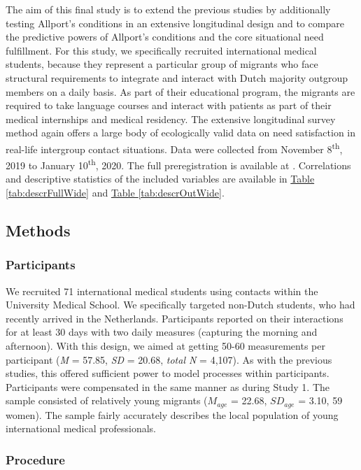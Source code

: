 \documentclass[man, 12pt, a4paper, mask]{apa7}
\theoremstyle{break}
\theoremstyle{plain}
\newcommand{\tblref}[2][]{\hyperref[#2]{Table \ref*{#2}#1}}
\begin{document}
The aim of this final study is to extend the previous studies by
additionally testing Allport's conditions in an extensive longitudinal
design and to compare the predictive powers of Allport's conditions and
the core situational need fulfillment. For this study, we specifically
recruited international medical students, because they represent a
particular group of migrants who face structural requirements to
integrate and interact with Dutch majority outgroup members on a daily
basis. As part of their educational program, the migrants are required
to take language courses and interact with patients as part of their
medical internships and medical residency. The extensive longitudinal
survey method again offers a large body of ecologically valid data on
need satisfaction in real-life intergroup contact situations. Data were
collected from November 8\textsuperscript{th}, 2019 to January
10\textsuperscript{th}, 2020. The full preregistration is available at
\citet[][]{KreienkampMasked2021f}. Correlations and descriptive
statistics of the included variables are available in
\tblref{tab:descrFullWide} and \tblref{tab:descrOutWide}.

\subsection{Methods}

\subsubsection{Participants}

We recruited 71 international medical students using contacts within the
University Medical School. We specifically targeted non-Dutch students,
who had recently arrived in the Netherlands. Participants reported on
their interactions for at least 30 days with two daily measures
(capturing the morning and afternoon). With this design, we aimed at
getting 50-60 measurements per participant (\textit{M} = 57.85,
\textit{SD} = 20.68, \textit{total N} = 4,107). As with the previous
studies, this offered sufficient power to model processes within
participants. Participants were compensated in the same manner as during
Study 1. The sample consisted of relatively young migrants (\(M_{age}\)
= 22.68, \(SD_{age}\) = 3.10, 59 women). The sample fairly accurately
describes the local population of young international medical
professionals.

\subsubsection{Procedure}
\end{document}

